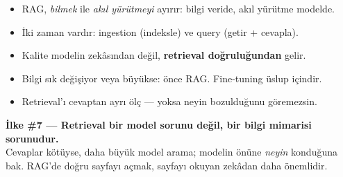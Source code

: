 \begin{itemize}
  \item RAG, \emph{bilmek} ile \emph{akıl yürütmeyi} ayırır: bilgi veride, akıl yürütme modelde.
  \item İki zaman vardır: ingestion (indeksle) ve query (getir + cevapla).
  \item Kalite modelin zekâsından değil, \textbf{retrieval doğruluğundan} gelir.
  \item Bilgi sık değişiyor veya büyükse: önce RAG. Fine-tuning üslup içindir.
  \item Retrieval'ı cevaptan ayrı ölç --- yoksa neyin bozulduğunu göremezsin.
\end{itemize}

\begin{principlebox}
\textbf{İlke \#7 — Retrieval bir model sorunu değil, bir bilgi mimarisi sorunudur.}\\[4pt]
\normalsize Cevaplar kötüyse, daha büyük model arama; modelin önüne \emph{neyin}
konduğuna bak. RAG'de doğru sayfayı açmak, sayfayı okuyan zekâdan daha önemlidir.
\end{principlebox}
